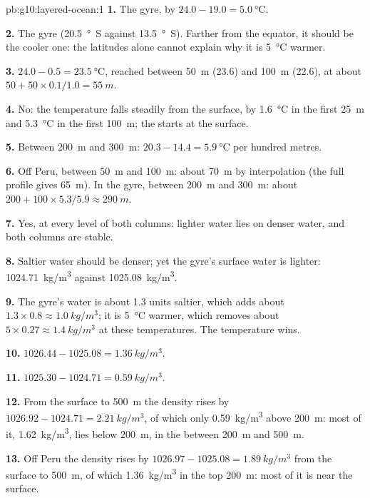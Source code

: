 \begin{solution}{pb:g10:layered-ocean:1}
\textbf{1.} The gyre, by $24.0 - 19.0 = \qty{5.0}{\degreeCelsius}$.

\textbf{2.} The gyre (\qty{20.5}{\degree S} against \qty{13.5}{\degree S}).
Farther from the equator, it should be the cooler one: the latitudes alone
cannot explain why it is \qty{5}{\degreeCelsius} warmer.

\textbf{3.} $24.0 - 0.5 = \qty{23.5}{\degreeCelsius}$, reached between
\qty{50}{m} (23.6) and \qty{100}{m} (22.6), at about $50 + 50 \times
0.1/1.0 = \qty{55}{m}$.

\textbf{4.} No: the temperature falls steadily from the surface, by
\qty{1.6}{\degreeCelsius} in the first \qty{25}{m} and \qty{5.3}{\degreeCelsius}
in the first \qty{100}{m}; the  starts at the surface.

\textbf{5.} Between \qty{200}{m} and \qty{300}{m}: $20.3 - 14.4 =
\qty{5.9}{\degreeCelsius}$ per hundred metres.

\textbf{6.} Off Peru, between \qty{50}{m} and \qty{100}{m}: about
\qty{70}{m} by interpolation (the full profile gives \qty{65}{m}). In the
gyre, between \qty{200}{m} and \qty{300}{m}: about $200 + 100 \times 5.3/5.9
\approx \qty{290}{m}$.

\textbf{7.} Yes, at every level of both columns: lighter water lies on denser
water, and both columns are stable.

\textbf{8.} Saltier water should be denser; yet the gyre's surface water is
lighter: \qty{1024.71}{kg/m^3} against \qty{1025.08}{kg/m^3}.

\textbf{9.} The gyre's water is about 1.3 units saltier, which adds about
$1.3 \times 0.8 \approx \qty{1.0}{kg/m^3}$; it is \qty{5}{\degreeCelsius}
warmer, which removes about $5 \times 0.27 \approx \qty{1.4}{kg/m^3}$ at these
temperatures. The temperature wins.

\textbf{10.} $1026.44 - 1025.08 = \qty{1.36}{kg/m^3}$.

\textbf{11.} $1025.30 - 1024.71 = \qty{0.59}{kg/m^3}$.

\textbf{12.} From the surface to \qty{500}{m} the density rises by
$1026.92 - 1024.71 = \qty{2.21}{kg/m^3}$, of which only \qty{0.59}{kg/m^3}
above \qty{200}{m}: most of it, \qty{1.62}{kg/m^3}, lies below
\qty{200}{m}, in the  between \qty{200}{m} and \qty{500}{m}.

\textbf{13.} Off Peru the density rises by $1026.97 - 1025.08 =
\qty{1.89}{kg/m^3}$ from the surface to \qty{500}{m}, of which
\qty{1.36}{kg/m^3} in the top \qty{200}{m}: most of it is near the surface.


\end{solution}
